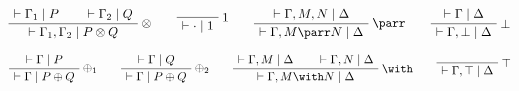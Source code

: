 \(\AxRule{\vdash\Gamma_1\mid P}
\AxRule{\vdash\Gamma_2\mid Q}
\LabelRule{\tens}
\BinRule{\vdash\Gamma_1,\Gamma_2\mid P\otimes Q}
\DisplayProof
\qquad
\LabelRule{\one}
\NulRule{\vdash\cdot\mid\one}
\DisplayProof
\qquad
\AxRule{\vdash\Gamma, M, N\mid \Delta}
\LabelRule{\parr}
\UnaRule{\vdash\Gamma, M\parr N\mid \Delta}
\DisplayProof
\qquad
\AxRule{\vdash\Gamma\mid \Delta}
\LabelRule{\bot}
\UnaRule{\vdash\Gamma, \bot\mid\Delta}
\DisplayProof\)

\(\AxRule{\vdash\Gamma\mid P}
\LabelRule{\plus_1}
\UnaRule{\vdash\Gamma\mid P\plus Q}
\DisplayProof
\qquad
\AxRule{\vdash\Gamma\mid Q}
\LabelRule{\plus_2}
\UnaRule{\vdash\Gamma\mid P\plus Q}
\DisplayProof
\qquad
\AxRule{\vdash\Gamma,M\mid \Delta}
\AxRule{\vdash\Gamma,N\mid \Delta}
\LabelRule{\with}
\BinRule{\vdash\Gamma,M\with N\mid \Delta}
\DisplayProof
\qquad
\LabelRule{\top}
\NulRule{\vdash\Gamma,\top\mid \Delta}
\DisplayProof\)


